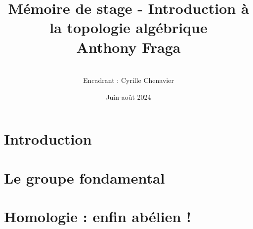 \documentclass[hidelinks, 8pt, oneside]{book}
\title{\Huge \textbf{Mémoire de stage - Introduction à la topologie algébrique}\\
[2cm]
\Large Anthony Fraga\vspace*{10\baselineskip}}
\author{\\
Encadrant : Cyrille Chenavier}
\date{Juin-août 2024}
\begin{document}
\maketitle
{\footnotesize \tableofcontents}

\chapter{Introduction}\label{chp:intro}



\chapter{Le groupe fondamental}\label{chp:homotopy}
\chapter{Homologie : enfin abélien !}\label{chp:homology}



\appendix


%

\printbibliography
\end{document}
